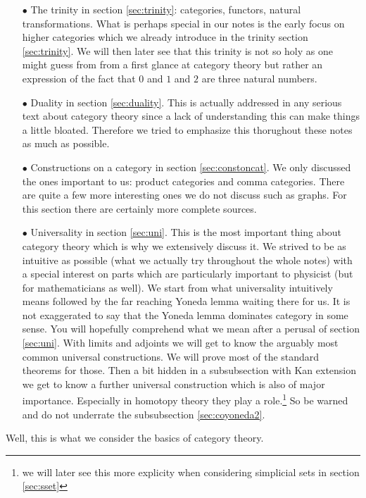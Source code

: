 \begin{enumerate}
\item[$\bullet$]
The trinity in section \ref{sec:trinity}: categories, functors, natural transformations. What is perhaps special in our notes is the early focus on higher categories which we already introduce in the trinity section \ref{sec:trinity}. We will then later see that this trinity is not so {\glqq}holy{\grqq} as one might guess from from a first glance at category theory but rather an expression of the fact that $0$ and $1$ and $2$ are three natural numbers. 
\item[$\bullet$]
Duality in section \ref{sec:duality}. This is actually addressed in any serious text about category theory since a lack of understanding this can make things a little bloated. Therefore we tried to emphasize this thorughout these notes as much as possible.
\item[$\bullet$]
Constructions on a category in section \ref{sec:constoncat}. We only discussed the ones important to us: product categories and comma categories. There are quite a few more interesting ones we do not discuss such as graphs. For this section there are certainly more complete sources.
\item[$\bullet$]
Universality in section \ref{sec:uni}. This is the most important thing about category theory which is why we extensively discuss it. We strived to be as intuitive as possible (what we actually try throughout the whole notes) with a special interest on parts which are particularly important to physicist (but for mathematicians as well). We start from what {\glqq}universality{\grqq} intuitively means followed by the far reaching Yoneda lemma waiting there for us. It is not exaggerated to say that the Yoneda lemma dominates category in some sense. You will hopefully comprehend what we mean after a perusal of section \ref{sec:uni}. With limits and adjoints we will get to know the arguably most common {\glqq}universal constructions{\grqq}. We will prove most of the standard theorems for those. Then a bit hidden in a subsubsection with Kan extension we get to know a further universal construction which is also of major importance. Especially in homotopy theory they play a role.\footnote{we will later see this more explicity when considering simplicial sets in section \ref{sec:sset}} So be warned and do not underrate the subsubsection \ref{sec:coyoneda2}.
\end{enumerate}
Well, this is what we consider the basics of category theory.
\\

